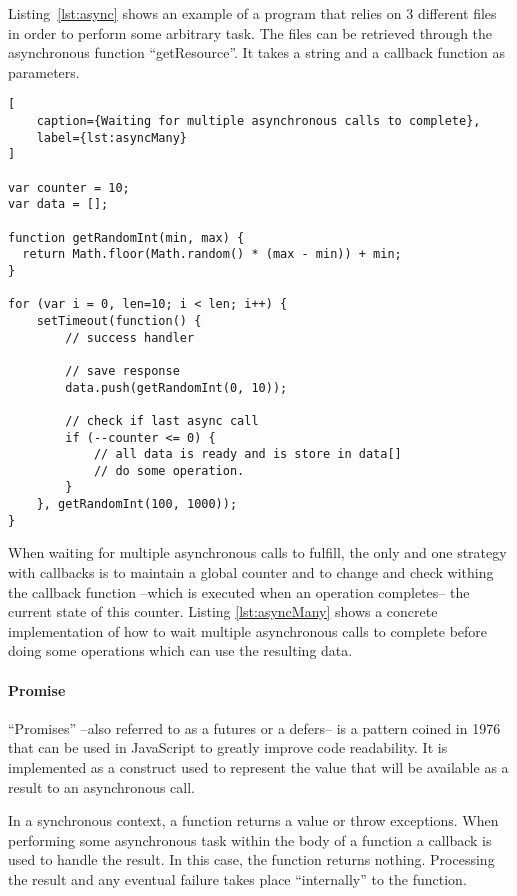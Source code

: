 Listing~\ref{lst:async} shows an example of a program that relies on 3 different files in order to perform some arbitrary task. The files can be retrieved through the asynchronous function ``getResource''. It takes a string and a callback function as parameters.

\begin{lstlisting}[
    caption={Waiting for multiple asynchronous calls to complete},
    label={lst:asyncMany}
]

var counter = 10;
var data = [];

function getRandomInt(min, max) {
  return Math.floor(Math.random() * (max - min)) + min;
}

for (var i = 0, len=10; i < len; i++) {
    setTimeout(function() {
        // success handler

        // save response
        data.push(getRandomInt(0, 10));

        // check if last async call
        if (--counter <= 0) {
            // all data is ready and is store in data[]
            // do some operation.
        }
    }, getRandomInt(100, 1000));
}
\end{lstlisting}

When waiting for multiple asynchronous calls to fulfill, the only and one strategy with callbacks is to maintain a global counter and to change and check withing the callback function --which is executed when an operation completes-- the current state of this counter. Listing \ref{lst:asyncMany} shows a concrete implementation of how to wait multiple asynchronous calls to complete before doing some operations which can use the resulting data.

\paragraph{Promise}

``Promises'' --also referred to as a futures or a defers-- is a pattern coined in 1976~\cite{Friedman1976} that can be used in JavaScript to greatly improve code readability. It is implemented as a construct used to represent the value that will be available as a result to an asynchronous call.

In a synchronous context, a function returns a value or throw exceptions. When performing some asynchronous task within the body of a function a callback is used to handle the result. In this case, the function returns nothing. Processing the result and any eventual failure takes place ``internally'' to the function.

